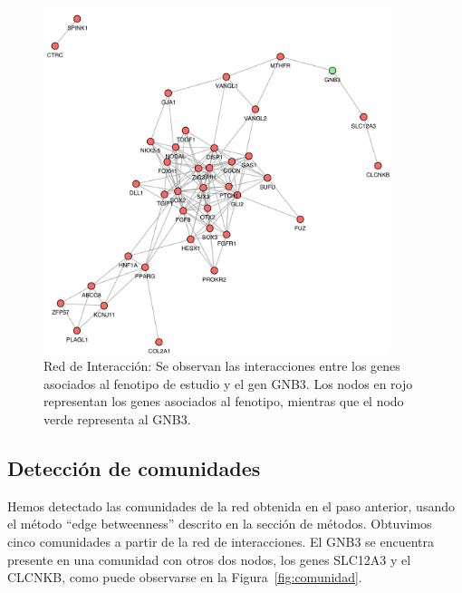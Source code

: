 \begin{figure}[h!]
	\includegraphics[width=0.9\textwidth]{figures/network.pdf}
	\caption{Red de Interacción: Se observan las interacciones entre los genes asociados al fenotipo de estudio y el gen GNB3. Los nodos en rojo representan los genes asociados al fenotipo, mientras que el nodo verde representa al GNB3.}
	\label{fig:network}
\end{figure}

\subsection{Detección de comunidades}

Hemos detectado las comunidades de la red obtenida en el paso anterior, usando el método ``edge betweenness'' descrito en la sección de métodos. Obtuvimos cinco comunidades a partir de la red de interacciones. El GNB3 se encuentra presente en una comunidad con otros dos nodos, los genes SLC12A3 y el CLCNKB, como puede observarse en la Figura~\ref{fig:comunidad}.

